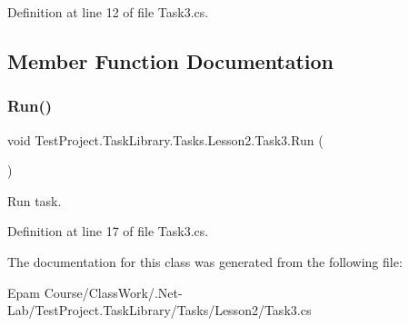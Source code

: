 Definition at line 12 of file Task3.\+cs.



\subsection{Member Function Documentation}
\mbox{\label{class_test_project_1_1_task_library_1_1_tasks_1_1_lesson2_1_1_task3_af4240900823a5d8e625f514a3261aefd}} 
\subsubsection{\texorpdfstring{Run()}{Run()}}
{\footnotesize\ttfamily void Test\+Project.\+Task\+Library.\+Tasks.\+Lesson2.\+Task3.\+Run (\begin{DoxyParamCaption}{ }\end{DoxyParamCaption})}



Run task. 



Definition at line 17 of file Task3.\+cs.



The documentation for this class was generated from the following file\+:\begin{DoxyCompactItemize}
\item 
Epam Course/\+Class\+Work/.\+Net-\/\+Lab/\+Test\+Project.\+Task\+Library/\+Tasks/\+Lesson2/Task3.\+cs\end{DoxyCompactItemize}
